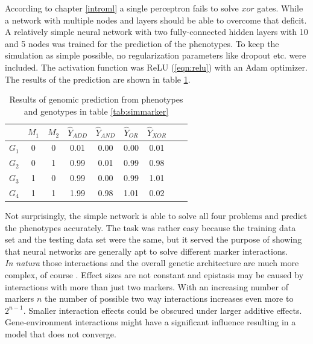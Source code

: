 According to chapter \ref{introml} a single perceptron fails to solve $xor$ gates. While a
network with multiple nodes and layers should be able to overcome that deficit. A
relatively simple neural network with two fully-connected hidden layers with 10 and 5
nodes was trained for the prediction of the phenotypes. To keep the simulation as simple
possible, no regularization parameters like dropout etc. were included. The activation
function was ReLU (\ref{eqn:relu}) with an Adam optimizer. The results of the prediction
are shown in table \ref{tab:simgpres}.

\begin{table}[H]
\caption{Results of genomic prediction from phenotypes and genotypes in table \ref{tab:simmarker}}
\label{tab:simgpres}
\centering
\begin{tabular}{ l c c | c c c c c c }
 \toprule
 & $M_1$ & $M_2$ & $\hat{Y}_{ADD}$ & $\hat{Y}_{AND}$ & $\hat{Y}_{OR}$ & $\hat{Y}_{XOR}$\\
 \midrule
 \hline 
 $G_1$ & 0 & 0 & 0.01 & 0.00 & 0.00 & 0.01 \\
 $G_2$ & 0 & 1 & 0.99 & 0.01 & 0.99 & 0.98 \\
 $G_3$ & 1 & 0 & 0.99 & 0.00 & 0.99 & 1.01 \\
 $G_4$ & 1 & 1 & 1.99 & 0.98 & 1.01 & 0.02 \\
 \bottomrule
\end{tabular}
\end{table}


Not surprisingly, the simple network is able to solve all four problems and predict the
phenotypes accurately. The task was rather easy because the training data set and the
testing data set were the same, but it served the purpose of showing that neural networks
are generally apt to solve different marker interactions. \\
\textit{In natura} those interactions and the overall genetic architecture are much more
complex, of course . Effect sizes are not constant and epistasis may be caused by
interactions with more than just two markers. With an increasing number of markers $n$ the
number of possible two way interactions increases even more to $2^{n-1}$. Smaller
interaction effects could be obscured under larger additive effects. Gene-environment
interactions might have a significant influence resulting in a model that does not
converge.


